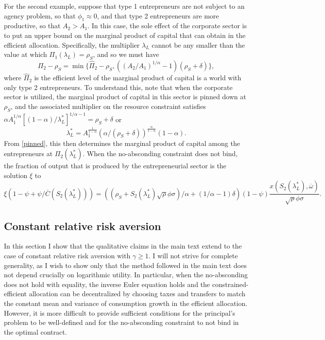 \documentclass[11pt]{article}
\theoremstyle{plain}
\theoremstyle{definition} %
\begin{document}
For the second example, suppose that type 1 entrepreneurs are not subject to an agency problem, so that $\phi_1 \approx 0$, and that type 2 entrepreneurs are more productive, so that $A_2 > A_1$. In this case, the sole effect of the corporate sector is to put an upper bound on the marginal product of capital that can obtain in the efficient allocation. Specifically, the multiplier $\lambda_L$ cannot be any smaller than the value at which $\Pi_1(\lambda_L) = \rho_S$, and so we must have 
$$
\Pi_2 - \rho_S = \min\{\hat{\Pi}_2 - \rho_S, ((A_2/A_1)^{1/\alpha} - 1)(\rho_S + \delta)\},
$$
where $\hat{\Pi}_2$ is the efficient level of the marginal product of capital is a world with only type 2 entrepreneurs. To understand this, note that when the corporate sector is utilized, the marginal product of capital in this sector is pinned down at $\rho_S$, and the associated multiplier on the resource constraint satisfies $\alpha A_1^{1/\alpha} [(1-\alpha)/\lambda_L^*]^{1/\alpha-1} = \rho_S + \delta$ or 
$$
\lambda_L^* = A_1^{\frac{1}{1-\alpha}}(\alpha/(\rho_S + \delta))^{\frac{\alpha}{1-\alpha}}(1-\alpha).
$$
From \eqref{pinned}, this then determines the marginal product of capital among the entrepreneurs at $\Pi_2(\lambda_L^*)$. When the no-absconding constraint does not bind, the fraction of output that is produced by the entrepreneurial sector is the solution $\xi$ to 
$$
\xi(1-\psi + \psi/\overline{C}(S_2(\lambda_L^*))) = {\left((\rho_S + S_2(\lambda_L^*)\sqrt{\rho}\phi \sigma)/\alpha + (1/\alpha-1)\delta \right)}(1-\psi)\frac{x(S_2(\lambda_L^*),\overline{\omega})}{\sqrt{\rho}\phi \sigma}.
$$

\subsection{Constant relative risk aversion}\label{CRRA}

In this section I show that the qualitative claims in the main text extend to the case of constant relative risk aversion with $\gamma \geq 1$. I will not strive for complete generality, as I wish to show only that the method followed in the main text does not depend crucially on logarithmic utility. In particular, when the no-absconding does not hold with equality, the inverse Euler equation holds and the constrained-efficient allocation can be decentralized by choosing taxes and transfers to match the constant mean and variance of consumption growth in the efficient allocation. However, it is more difficult to provide sufficient conditions for the principal's problem to be well-defined and for the no-absconding constraint to not bind in the optimal contract. 
\end{document}
